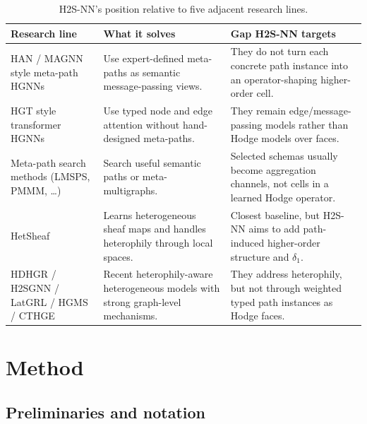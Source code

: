 \documentclass{article}
\begin{document}
\begin{table}[h]
  \centering
  \caption{H2S-NN's position relative to five adjacent research lines.}
  \label{tab:positioning}
  \small
  \begin{tabular}{p{3.1cm}p{4.6cm}p{4.6cm}}
    \toprule
    \textbf{Research line} & \textbf{What it solves} & \textbf{Gap H2S-NN targets} \\
    \midrule
    HAN / MAGNN style meta-path HGNNs & Use expert-defined meta-paths as semantic message-passing views. & They do not turn each concrete path instance into an operator-shaping higher-order cell. \\
    HGT style transformer HGNNs & Use typed node and edge attention without hand-designed meta-paths. & They remain edge/message-passing models rather than Hodge models over faces. \\
    Meta-path search methods (LMSPS, PMMM, \ldots) & Search useful semantic paths or meta-multigraphs. & Selected schemas usually become aggregation channels, not cells in a learned Hodge operator. \\
    HetSheaf & Learns heterogeneous sheaf maps and handles heterophily through local spaces. & Closest baseline, but H2S-NN aims to add path-induced higher-order structure and $\delta_1$. \\
    HDHGR / H2SGNN / LatGRL / HGMS / CTHGE & Recent heterophily-aware heterogeneous models with strong graph-level mechanisms. & They address heterophily, but not through weighted typed path instances as Hodge faces. \\
    \bottomrule
  \end{tabular}
\end{table}

\section{Method}
\label{sec:method}

\subsection{Preliminaries and notation}
\end{document}
